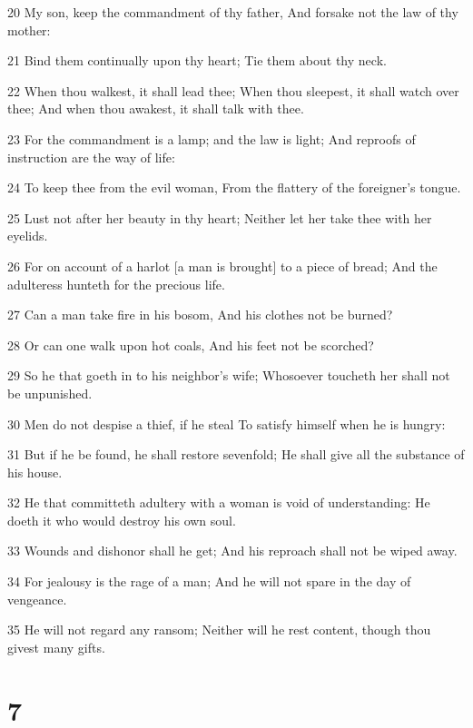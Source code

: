\par 20 My son, keep the commandment of thy father, And forsake not the law of thy mother:
\par 21 Bind them continually upon thy heart; Tie them about thy neck.
\par 22 When thou walkest, it shall lead thee; When thou sleepest, it shall watch over thee; And when thou awakest, it shall talk with thee.
\par 23 For the commandment is a lamp; and the law is light; And reproofs of instruction are the way of life:
\par 24 To keep thee from the evil woman, From the flattery of the foreigner's tongue.
\par 25 Lust not after her beauty in thy heart; Neither let her take thee with her eyelids.
\par 26 For on account of a harlot [a man is brought] to a piece of bread; And the adulteress hunteth for the precious life.
\par 27 Can a man take fire in his bosom, And his clothes not be burned?
\par 28 Or can one walk upon hot coals, And his feet not be scorched?
\par 29 So he that goeth in to his neighbor's wife; Whosoever toucheth her shall not be unpunished.
\par 30 Men do not despise a thief, if he steal To satisfy himself when he is hungry:
\par 31 But if he be found, he shall restore sevenfold; He shall give all the substance of his house.
\par 32 He that committeth adultery with a woman is void of understanding: He doeth it who would destroy his own soul.
\par 33 Wounds and dishonor shall he get; And his reproach shall not be wiped away.
\par 34 For jealousy is the rage of a man; And he will not spare in the day of vengeance.
\par 35 He will not regard any ransom; Neither will he rest content, though thou givest many gifts.

\chapter{7}

